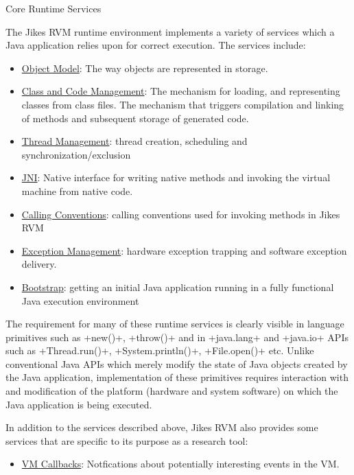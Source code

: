 \begin{chapter}{Core Runtime Services}
\label{cha:coreruntimeservices}

The Jikes RVM runtime environment implements a variety of services which a Java application relies upon for correct execution. The services include:

\begin{itemize}
  \item \hyperref[sec:objectmodel]{Object Model}: The way objects are represented in storage.
  \item \hyperref[sec:classandcodemanagement]{Class and Code Management}: The mechanism for loading, and representing classes from class files. The mechanism that triggers compilation and linking of methods and subsequent storage of generated code.
  \item \hyperref[sec:threadmanagement]{Thread Management}: thread creation, scheduling and synchronization/exclusion
  \item \hyperref[sec:jni]{JNI}: Native interface for writing native methods and invoking the virtual machine from native code.
  \item \hyperref[sec:callingconventions]{Calling Conventions}: calling conventions used for invoking methods in Jikes RVM
  \item \hyperref[sec:exceptionmanagement]{Exception Management}: hardware exception trapping and software exception delivery.
  \item \hyperref[sec:bootstrap]{Bootstrap}: getting an initial Java application running in a fully functional Java execution environment
\end{itemize}

The requirement for many of these runtime services is clearly visible in language primitives such as \spverb+new()+, \spverb+throw()+ and in \spverb+java.lang+ and \spverb+java.io+ APIs such as \spverb+Thread.run()+, \spverb+System.println()+, \spverb+File.open()+ etc. Unlike conventional Java APIs which merely modify the state of Java objects created by the Java application, implementation of these primitives requires interaction with and modification of the platform (hardware and system software) on which the Java application is being executed.

In addition to the services described above, Jikes RVM also provides some services that are specific to its purpose as 
a research tool:
\begin{itemize}
  \item \hyperref[sec:vmcallbacks]{VM Callbacks}: Notfications about potentially interesting events in the VM.
\end{itemize}


















\end{chapter}
